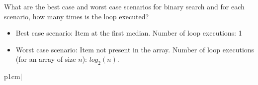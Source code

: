 \begin{exercise}
What are the best case and worst case scenarios for binary search and for each scenario, how many times is the loop executed?
\end{exercise}
\begin{answer}
\begin{itemize}
\item Best case scenario: Item at the first median. Number of loop executions: 1
\item Worst case scenario: Item not present in the array. Number of loop executions (for an array of size $n$): $log_2(n)$.	
\end{itemize}
\end{answer}



p{1cm}|
